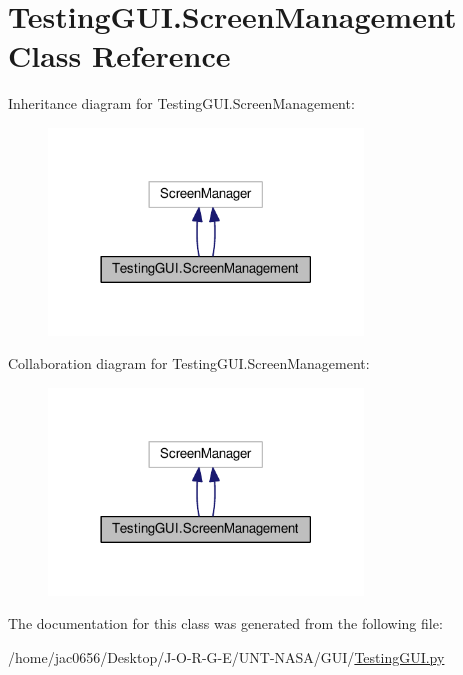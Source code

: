 \hypertarget{classTestingGUI_1_1ScreenManagement}{}\section{Testing\+G\+U\+I.\+Screen\+Management Class Reference}
\label{classTestingGUI_1_1ScreenManagement}


Inheritance diagram for Testing\+G\+U\+I.\+Screen\+Management\+:\nopagebreak
\begin{figure}[H]
\begin{center}
\leavevmode
\includegraphics[width=237pt]{classTestingGUI_1_1ScreenManagement__inherit__graph}
\end{center}
\end{figure}


Collaboration diagram for Testing\+G\+U\+I.\+Screen\+Management\+:\nopagebreak
\begin{figure}[H]
\begin{center}
\leavevmode
\includegraphics[width=237pt]{classTestingGUI_1_1ScreenManagement__coll__graph}
\end{center}
\end{figure}


The documentation for this class was generated from the following file\+:\begin{DoxyCompactItemize}
\item 
/home/jac0656/\+Desktop/\+J-\/\+O-\/\+R-\/\+G-\/\+E/\+U\+N\+T-\/\+N\+A\+S\+A/\+G\+U\+I/\hyperlink{GUI_2TestingGUI_8py}{Testing\+G\+U\+I.\+py}\end{DoxyCompactItemize}

